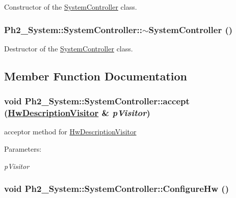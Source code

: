 Constructor of the \hyperlink{class_ph2___system_1_1_system_controller}{System\-Controller} class. 

\hypertarget{class_ph2___system_1_1_system_controller_bd794b0a85d9d83ec553d707875efcf1}{
\subsubsection[$\sim$SystemController]{\setlength{\rightskip}{0pt plus 5cm}Ph2\_\-System::System\-Controller::$\sim$System\-Controller ()}}
\label{class_ph2___system_1_1_system_controller_bd794b0a85d9d83ec553d707875efcf1}


Destructor of the \hyperlink{class_ph2___system_1_1_system_controller}{System\-Controller} class. 



\subsection{Member Function Documentation}
\hypertarget{class_ph2___system_1_1_system_controller_3cffbcd10fcf3804d78f8a91dfdab39e}{
\subsubsection[accept]{\setlength{\rightskip}{0pt plus 5cm}void Ph2\_\-System::System\-Controller::accept (\hyperlink{class_hw_description_visitor}{Hw\-Description\-Visitor} \& {\em p\-Visitor})}}
\label{class_ph2___system_1_1_system_controller_3cffbcd10fcf3804d78f8a91dfdab39e}


acceptor method for \hyperlink{class_hw_description_visitor}{Hw\-Description\-Visitor} 

\begin{Desc}
\item[Parameters:]
\begin{description}
\item[{\em p\-Visitor}]\end{description}
\end{Desc}
\hypertarget{class_ph2___system_1_1_system_controller_f0bb978523eb3a6436650d9e4f112432}{
\subsubsection[ConfigureHw]{\setlength{\rightskip}{0pt plus 5cm}void Ph2\_\-System::System\-Controller::Configure\-Hw ()}}
\label{class_ph2___system_1_1_system_controller_f0bb978523eb3a6436650d9e4f112432}


